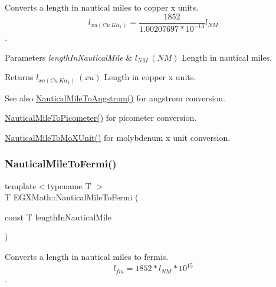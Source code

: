 Converts a length in nautical miles to copper x units. \[ l_{xu(Cu\ K\alpha_1)}= \frac{1852}{1.00207697*10^{-13}} l_{NM}\]. 


\begin{DoxyParams}{Parameters}
{\em length\+In\+Nautical\+Mile} & $ l_{NM}\ (NM)$ Length in nautical miles. \\
\hline
\end{DoxyParams}
\begin{DoxyReturn}{Returns}
$ l_{xu(Cu\ K\alpha_1)}\ (xu)$ Length in copper x units. 
\end{DoxyReturn}
\begin{DoxySeeAlso}{See also}
\mbox{\hyperlink{group___e_g_x_math-_conversions-_length_conversions-_nautical-_nautical_mile-_non-_s_i_ga6f451e4456d985c7d63b39a084b3dd23}{Nautical\+Mile\+To\+Angstrom()}} for angstrom conversion. 

\mbox{\hyperlink{group___e_g_x_math-_conversions-_length_conversions-_nautical-_nautical_mile-_s_i_ga5ab6a92054685d45fb032111bcde94e0}{Nautical\+Mile\+To\+Picometer()}} for picometer conversion. 

\mbox{\hyperlink{group___e_g_x_math-_conversions-_length_conversions-_nautical-_nautical_mile-_non-_s_i_ga17cfe98568d00c2e0b1c0b5d19f1b34e}{Nautical\+Mile\+To\+Mo\+X\+Unit()}} for molybdenum x unit conversion. 
\end{DoxySeeAlso}
\mbox{\label{group___e_g_x_math-_conversions-_length_conversions-_nautical-_nautical_mile-_non-_s_i_gaa4b84422943c37e49e5c3abdc7f301e4}} 
\subsubsection{\texorpdfstring{Nautical\+Mile\+To\+Fermi()}{NauticalMileToFermi()}}
{\footnotesize\ttfamily template$<$typename T $>$ \\
T E\+G\+X\+Math\+::\+Nautical\+Mile\+To\+Fermi (\begin{DoxyParamCaption}\item[{const T}]{length\+In\+Nautical\+Mile }\end{DoxyParamCaption})}



Converts a length in nautical miles to fermis. \[ l_{fm}=1852 * l_{NM} * 10^{15} \]. 


